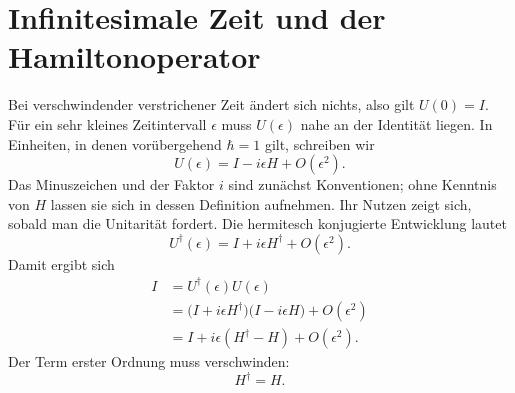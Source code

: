 \begin{classroomqa}\end{classroomqa}

\begin{classroomqa}\end{classroomqa}

\section{Infinitesimale Zeit und der Hamiltonoperator}

Bei verschwindender verstrichener Zeit ändert sich nichts, also gilt \(U(0)=I\). Für ein sehr kleines Zeitintervall \(\epsilon\) muss \(U(\epsilon)\) nahe an der Identität liegen. In Einheiten, in denen vorübergehend \(\hbar=1\) gilt, schreiben wir
\begin{equation}
U(\epsilon)=I-i\epsilon H+O(\epsilon^2).
\label{eq:l4-small-u}
\end{equation}
Das Minuszeichen und der Faktor \(i\) sind zunächst Konventionen; ohne Kenntnis von \(H\) lassen sie sich in dessen Definition aufnehmen. Ihr Nutzen zeigt sich, sobald man die Unitarität fordert. Die hermitesch konjugierte Entwicklung lautet
\begin{equation}
U^\dagger(\epsilon)=I+i\epsilon H^\dagger+O(\epsilon^2).
\end{equation}
Damit ergibt sich
\begin{align}
I
&=U^\dagger(\epsilon)U(\epsilon)\\
&=\bigl(I+i\epsilon H^\dagger\bigr)
  \bigl(I-i\epsilon H\bigr)+O(\epsilon^2)\\
&=I+i\epsilon(H^\dagger-H)+O(\epsilon^2).
\end{align}
Der Term erster Ordnung muss verschwinden:
\begin{equation}
H^\dagger=H.
\label{eq:l4-h-hermitian}
\end{equation}


